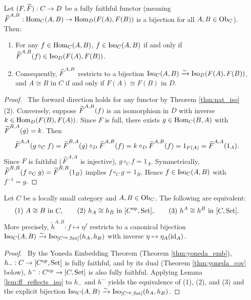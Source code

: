 \documentclass[10pt,a4paper]{article}
\renewcommand{\myprf}{\begin{proof}}
\renewcommand{\myqed}{\end{proof}}
\begin{document}
\begin{lemma}\label{lem:ff_reflects_iso}
Let $(F, {\widetilde{F}\textrm{}}) : C \to D$ be a fully faithful functor (meaning ${\widetilde{F}\textrm{}}^{A,B} : {\textrm{Hom}}_C(A,B) \to {\textrm{Hom}}_D(F(A), F(B))$ is a bijection for all $A, B \in {\textrm{Ob}}_C$). Then:
\begin{enumerate}
\item For any $f \in {\textrm{Hom}}_C(A,B)$, $f \in {\mathrm{Iso}}_C(A,B)$ if and only if ${\widetilde{F}\textrm{}}^{A,B}(f) \in {\mathrm{Iso}}_D(F(A), F(B))$.
\item Consequently, ${\widetilde{F}\textrm{}}^{A,B}$ restricts to a bijection ${\mathrm{Iso}}_C(A,B) \xrightarrow{\sim} {\mathrm{Iso}}_D(F(A), F(B))$, and $A \cong B$ in $C$ if and only if $F(A) \cong F(B)$ in $D$.
\end{enumerate}
\end{lemma}
\myprf\ The forward direction holds for any functor by Theorem \ref{thm:nat_iso}(2). Conversely, suppose ${\widetilde{F}\textrm{}}^{A,B}(f)$ is an isomorphism in $D$ with inverse $k \in {\textrm{Hom}}_D(F(B), F(A))$. Since $F$ is full, there exists $g \in {\textrm{Hom}}_C(B,A)$ with ${\widetilde{F}\textrm{}}^{B,A}(g) = k$. Then
$${\widetilde{F}\textrm{}}^{A,A}(g \circ_C f) = {\widetilde{F}\textrm{}}^{B,A}(g) \circ_D {\widetilde{F}\textrm{}}^{A,B}(f) = k \circ_D {\widetilde{F}\textrm{}}^{A,B}(f) = 1_{F(A)} = {\widetilde{F}\textrm{}}^{A,A}(1_A).$$
Since $F$ is faithful (${\widetilde{F}\textrm{}}^{A,A}$ is injective), $g \circ_C f = 1_A$. Symmetrically, ${\widetilde{F}\textrm{}}^{B,B}(f \circ_C g) = {\widetilde{F}\textrm{}}^{B,B}(1_B)$ implies $f \circ_C g = 1_B$. Hence $f \in {\mathrm{Iso}}_C(A,B)$ with $f^{-1} = g$. \myqed

\begin{theorem}\label{thm:yoneda_iso}
Let $C$ be a locally small category and $A, B \in {\textrm{Ob}}_C$. The following are equivalent:
$$\text{(1) } A \cong B \text{ in } C, \qquad \text{(2) } h_A \cong h_B \text{ in } [C^{\textrm{op}}, {\textrm{Set}}], \qquad \text{(3) } h^A \cong h^B \text{ in } [C, {\textrm{Set}}].$$
More precisely, $\widetilde{h}^{A,B} : f \mapsto \eta^f$ restricts to a canonical bijection ${\mathrm{Iso}}_C(A, B) \xrightarrow{\sim} {\mathrm{Iso}}_{[C^{\textrm{op}}, {\textrm{Set}}]}(h_A, h_B)$ with inverse $\eta \mapsto \eta_A({\textrm{id}}_A)$.
\end{theorem}
\myprf\ By the Yoneda Embedding Theorem (Theorem \ref{thm:yoneda_emb}), $h_- : C \to [C^{\textrm{op}}, {\textrm{Set}}]$ is fully faithful, and by its dual (Theorem \ref{thm:yoneda_cov} below), $h^- : C^{\textrm{op}} \to [C, {\textrm{Set}}]$ is also fully faithful. Applying Lemma \ref{lem:ff_reflects_iso} to $h_-$ and $h^-$ yields the equivalence of (1), (2), and (3) and the explicit bijection ${\mathrm{Iso}}_C(A, B) \xrightarrow{\sim} {\mathrm{Iso}}_{[C^{\textrm{op}}, {\textrm{Set}}]}(h_A, h_B)$. \myqed
\end{document}
